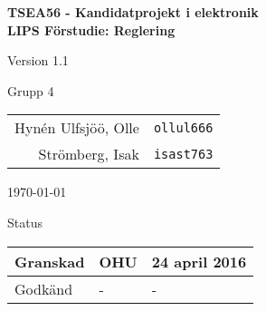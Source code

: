 \documentclass[11pt]{article}
\begin{document}
\begin{titlepage}
\begin{center}

{\Large\bfseries TSEA56 - Kandidatprojekt i elektronik \\ LIPS Förstudie: Reglering}

\vspace{5em}

Version 1.1

\vspace{5em}
Grupp 4 \\
\begin{tabular}{rl}
Hynén Ulfsjöö, Olle&\verb+ollul666+
\\
Strömberg, Isak&\verb+isast763+
\\
\end{tabular}

\vspace{5em}
\today

\vspace{16em}
Status
\begin{longtable}{|l|l|l|} \hline

Granskad & OHU & 24 april 2016 \\ \hline
Godkänd & - & - \\ \hline
 
\end{longtable}

\end{center}
\end{titlepage}
\end{document}
